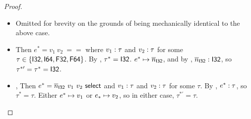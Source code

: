 \documentclass{article}
\begin{document}
\begin{proof}
\begin{itemize}
    \item {}
        Omitted for brevity on the grounds of being mechanically identical to the above case.
    
    \item {}
        Then $e^* = v_1~ v_2~ ==$ where $v_1 : \tau$ and $v_2 : \tau$ for some $\tau \in \{\mathsf{I32}, \mathsf{I64}, \mathsf{F32}, \mathsf{F64}\}$.
        By , $\tau^* = \mathsf{I32}$.
        $e^* \mapsto \overline{n}_{\mathsf{I32}}$, and by , $\overline{n}_{\mathsf{I32}} : \mathsf{I32}$, so $\tau^{*\prime} = \tau^* = \mathsf{I32}$.
    
    \item {}, 
        Then $e^* = \overline{n}_{\mathsf{I32}} ~ v_1 ~ v_2 ~ \mathsf{select}$ and $v_1 : \tau$ and $v_2 : \tau$ for some $\tau$.
        By , $e^* : \tau$, so $\tau^* = \tau$.
        Either $e^* \mapsto v_1$ or $e_* \mapsto v_2$, so in either case, $\tau^{*\prime} = \tau$.
\end{itemize}

\end{proof}



\end{document}
